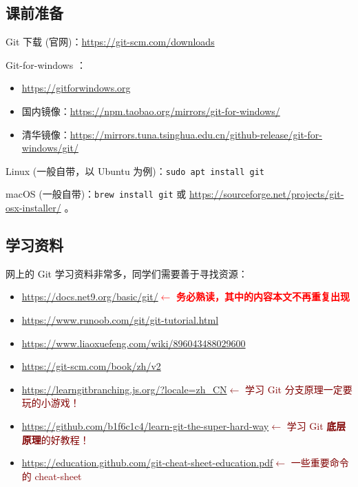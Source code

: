 \documentclass{article}
\begin{document}
	\pagebreak

	\subsection{课前准备}

	Git 下载 (官网)：\url{https://git-scm.com/downloads}

	Git-for-windows \cite{sast2021-git}：
	\begin{itemize}
		\itemsep0pt
		\item \url{https://gitforwindows.org}
		\item 国内镜像：\url{https://npm.taobao.org/mirrors/git-for-windows/}
		\item 清华镜像：\url{https://mirrors.tuna.tsinghua.edu.cn/github-release/git-for-windows/git/}
	\end{itemize}

	Linux (一般自带，以 Ubuntu 为例)：\texttt{sudo apt install git}

	macOS (一般自带)：\texttt{brew install git} 或 \url{https://sourceforge.net/projects/git-osx-installer/} \cite{sast2021-git}。

	\subsection{学习资料}

	网上的 Git 学习资料非常多，同学们需要善于寻找资源：

	\begin{itemize}
		\itemsep0pt
		\item \url{https://docs.net9.org/basic/git/}\quad\textcolor{red}{$\gets$ \textbf{务必熟读，其中的内容本文不再重复出现}}
		\item \url{https://www.runoob.com/git/git-tutorial.html}
		\item \url{https://www.liaoxuefeng.com/wiki/896043488029600}
		\item \url{https://git-scm.com/book/zh/v2}
		\item \url{https://learngitbranching.js.org/?locale=zh_CN}\quad\textcolor{maroon}{$\gets$ 学习 Git 分支原理一定要玩的小游戏！}
		\item \url{https://github.com/b1f6c1c4/learn-git-the-super-hard-way}\quad\textcolor{maroon}{$\gets$ 学习 Git \textbf{底层原理}的好教程！}
		\item \url{https://education.github.com/git-cheat-sheet-education.pdf}\quad\textcolor{maroon}{$\gets$ 一些重要命令的 cheat-sheet}
	\end{itemize}
\end{document}
